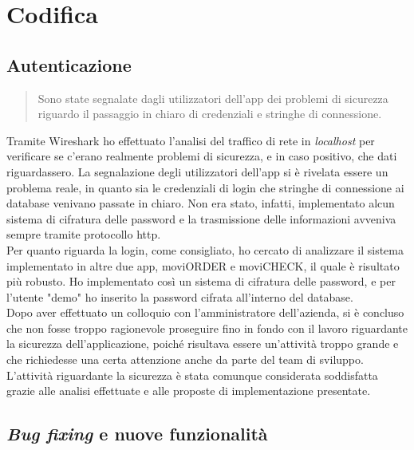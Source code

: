 \chapter{Codifica}
\label{cap:codifica}


\section{Autenticazione}

\begin{quote}
    Sono state segnalate dagli utilizzatori dell'app dei problemi di sicurezza riguardo il passaggio in chiaro di credenziali e stringhe di connessione.
\end{quote}
\noindent Tramite Wireshark ho effettuato l'analisi del traffico di rete in \emph{localhost} per verificare se c'erano realmente problemi di sicurezza, e in caso positivo, che dati riguardassero. La segnalazione degli utilizzatori dell'app si è rivelata essere un problema reale, in quanto sia le credenziali di login che stringhe di connessione ai database venivano passate in chiaro. Non era stato, infatti, implementato alcun sistema di cifratura delle password e la trasmissione delle informazioni avveniva sempre tramite protocollo http.\\
Per quanto riguarda la login, come consigliato, ho cercato di analizzare il sistema implementato in altre due app, moviORDER e moviCHECK, il quale è risultato più robusto. Ho implementato così un sistema di cifratura delle password, e per l'utente "demo" ho inserito la password cifrata all'interno del database.\\
Dopo aver effettuato un colloquio con l'amministratore dell'azienda, si è concluso che non fosse troppo ragionevole proseguire fino in fondo con il lavoro riguardante la sicurezza dell'applicazione, poiché risultava essere un'attività troppo grande e che richiedesse una certa attenzione anche da parte del team di sviluppo. L'attività riguardante la sicurezza è stata comunque considerata soddisfatta grazie alle analisi effettuate e alle proposte di implementazione presentate.

\section{\emph{Bug fixing} e nuove funzionalità}

